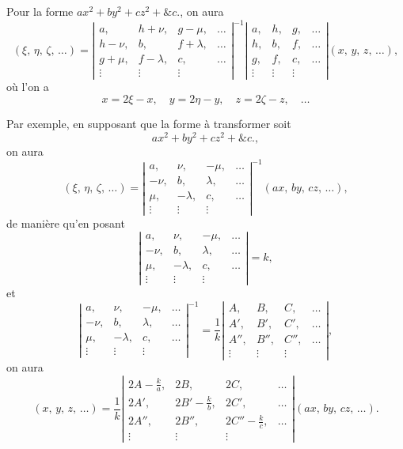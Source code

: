 \documentclass[11pt,a4paper]{article}
\theoremstyle{definition}
\begin{document}
Pour la forme $ax^2 + by^2 + cz^2 + \&c.$, on aura
\[
(\xi,\, \eta,\, \zeta,\, \ldots) =
\left|
\begin{array}{cccc}
a, & h+\nu, & g-\mu, & \ldots \\
h-\nu, & b, & f+\lambda, & \ldots \\
g+\mu, & f-\lambda, & c, & \ldots \\
\vdots & \vdots & \vdots &
\end{array}
\right|^{-1}
\left|
\begin{array}{cccc}
a, & h, & g, & \ldots \\
h, & b, & f, & \ldots \\
g, & f, & c, & \ldots \\
\vdots & \vdots & \vdots &
\end{array}
\right|
(x,\, y,\, z,\, \ldots),
\]
o\`u l'on a
\[
x = 2\xi - x,\quad y = 2\eta - y,\quad z = 2\zeta - z,\quad \ldots
\]

Par exemple, en supposant que la forme \`a transformer soit
\[
ax^2 + by^2 + cz^2 + \&c.,
\]
on aura
\[
(\xi,\, \eta,\, \zeta,\, \ldots) =
\left|
\begin{array}{cccc}
a, & \nu, & -\mu, & \ldots \\
-\nu, & b, & \lambda, & \ldots \\
\mu, & -\lambda, & c, & \ldots \\
\vdots & \vdots & \vdots &
\end{array}
\right|^{-1}
(ax,\, by,\, cz,\, \ldots),
\]
de mani\`ere qu'en posant
\[
\left|
\begin{array}{cccc}
a, & \nu, & -\mu, & \ldots \\
-\nu, & b, & \lambda, & \ldots \\
\mu, & -\lambda, & c, & \ldots \\
\vdots & \vdots & \vdots &
\end{array}
\right| = k,
\]
et
\[
\left|
\begin{array}{cccc}
a, & \nu, & -\mu, & \ldots \\
-\nu, & b, & \lambda, & \ldots \\
\mu, & -\lambda, & c, & \ldots \\
\vdots & \vdots & \vdots &
\end{array}
\right|^{-1}
= \frac{1}{k}
\left|
\begin{array}{cccc}
A, & B, & C, & \ldots \\
A', & B', & C', & \ldots \\
A'', & B'', & C'', & \ldots \\
\vdots & \vdots & \vdots &
\end{array}
\right|,
\]
on aura
\[
(x,\, y,\, z,\, \ldots) = \frac{1}{k}
\left|
\begin{array}{cccc}
2A-\tfrac{k}{a}, & 2B, & 2C, & \ldots \\
2A', & 2B'-\tfrac{k}{b}, & 2C', & \ldots \\
2A'', & 2B'', & 2C''-\tfrac{k}{c}, & \ldots \\
\vdots & \vdots & \vdots &
\end{array}
\right|
(ax,\, by,\, cz,\, \ldots).
\]
\end{document}
